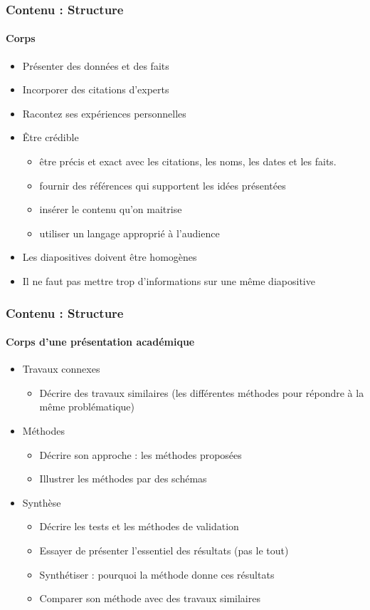 \documentclass[xcolor=table, usenames,dvipsnames]{beamer}
\begin{document}
\begin{frame}
\frametitle{Contenu : Structure}
\framesubtitle{Corps}

\begin{itemize}
	\item Présenter des données et des faits
	\item Incorporer des citations d'experts
	\item Racontez ses expériences personnelles
	\item Être crédible
	\begin{itemize}
		\item être précis et exact avec les citations, les noms, les dates et les faits.
		\item fournir des références qui supportent les idées présentées
		\item insérer le contenu qu'on maitrise 
		\item utiliser un langage approprié à l'audience
	\end{itemize}
	\item Les diapositives doivent être homogènes 
	\item Il ne faut pas mettre trop d'informations sur une même diapositive
\end{itemize}

\end{frame}

\begin{frame}
\frametitle{Contenu : Structure}
\framesubtitle{Corps d'une présentation académique}

\begin{itemize}
	\item Travaux connexes
	\begin{itemize}
		\item Décrire des travaux similaires (les différentes méthodes pour répondre à la même problématique)
	\end{itemize}
	\item Méthodes
	\begin{itemize}
		\item Décrire son approche : les méthodes proposées 
		\item Illustrer les méthodes par des schémas
	\end{itemize}
	\item Synthèse
	\begin{itemize}
		\item Décrire les tests et les méthodes de validation 
		\item Essayer de présenter l'essentiel des résultats (pas le tout)
		\item Synthétiser : pourquoi la méthode donne ces résultats 
		\item Comparer son méthode avec des travaux similaires
	\end{itemize}
\end{itemize}

\end{frame}
\end{document}
